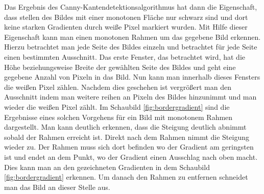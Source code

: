 Das Ergebnis des Canny-Kantendetektionsalgorithmus hat dann die Eigenschaft, dass stellen des Bildes mit einer monotonen Fläche nur schwarz sind und dort keine starken Gradienten durch weiße Pixel markiert wurden. Mit Hilfe dieser Eigenschaft kann man einen monotonen Rahmen um das gegebene Bild erkennen. Hierzu betrachtet man jede Seite des Bildes einzeln und betrachtet für jede Seite einen bestimmten Ausschnitt. Das erste Fenster, das betrachtet wird, hat die Höhe beziehungsweise Breite der gewählten Seite des Bildes und geht eine gegebene Anzahl von Pixeln in das Bild. Nun kann man innerhalb dieses Fensters die weißen Pixel zählen. Nachdem dies geschehen ist vergrößert man den Ausschnitt indem man weitere reihen an Pixeln des Bildes hinzunimmt und man wieder die weißen Pixel zählt. Im Schaubild \ref{fig:bordergradient} sind die Ergebnisse eines solchen Vorgehens für ein Bild mit monotonem Rahmen dargestellt. Man kann deutlich erkennen, dass die Steigung deutlich abnimmt sobald der Rahmen erreicht ist. Direkt nach dem Rahmen nimmt die Steigung wieder zu. Der Rahmen muss sich dort befinden wo der Gradient am geringsten ist und endet an dem Punkt, wo der Gradient einen Ausschlag nach oben macht. Dies kann man an den gezeichneten Gradienten in dem Schaubild \ref{fig:bordergradient} erkennen. Um danach den Rahmen zu entfernen schneidet man das Bild an dieser Stelle aus.    

